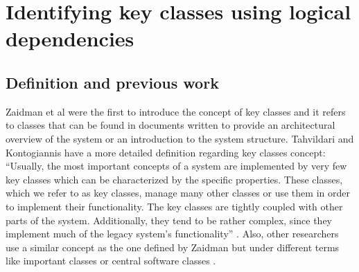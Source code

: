\documentclass[12pt]{mitthesis}
\begin{document}
\begin{table}[H]
\renewcommand{\arraystretch}{1}
\captionsetup{font=scriptsize}
\caption{Found systems and versions of the systems in GitHub. }
\label{tab:gitfoundsystems}
\centering
{}
\end{table}


\section{Identifying key classes using logical dependencies}
\subsection{Definition and previous work}
Zaidman et al \cite{ZaidmanJurnal} were the first to introduce the concept of key classes and it refers to classes that can be found in documents written to provide an architectural overview of the system or an introduction to the system structure. 
Tahvildari and Kontogiannis have a more detailed definition regarding key classes concept: “Usually, the most important concepts of a system are implemented by very few key classes which can be characterized by the specific properties. These classes, which we refer to as key classes, manage many other classes or use them in order to implement their functionality. The key classes are tightly coupled with other parts of the system. Additionally, they tend to be rather complex, since they implement much of the legacy system’s functionality” \cite{Tahvildari2004ImprovingDQ}.
Also, other researchers use a similar concept as the one defined by Zaidman but under different terms like important classes  \cite{Meyer2014IdentifyingIC} or central software classes \cite{CentralClassesSteidl}.
\end{document}
